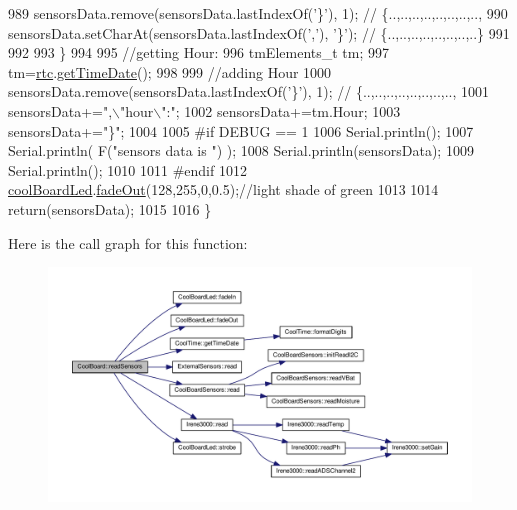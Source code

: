 \begin{DoxyCode}
989         sensorsData.remove(sensorsData.lastIndexOf(\textcolor{charliteral}{'\}'}), 1); \textcolor{comment}{// \{..,..,..,..,..,..,..,..,}
990         sensorsData.setCharAt(sensorsData.lastIndexOf(\textcolor{charliteral}{','}), \textcolor{charliteral}{'\}'}); \textcolor{comment}{// \{..,..,..,..,..,..,..,..\}      }
991         
992         
993     \}
994 
995     \textcolor{comment}{//getting Hour:}
996     tmElements\_t tm;
997     tm=\hyperlink{classCoolBoard_a50d2a6716879d64a85f3c6b44ad63275}{rtc}.\hyperlink{classCoolTime_a7a7501c5ca77dd1248bea704c44f986c}{getTimeDate}();
998     
999     \textcolor{comment}{//adding Hour}
1000     sensorsData.remove(sensorsData.lastIndexOf(\textcolor{charliteral}{'\}'}), 1); \textcolor{comment}{// \{..,..,..,..,..,..,..,..,   }
1001     sensorsData+=\textcolor{stringliteral}{",\(\backslash\)"hour\(\backslash\)":"};  
1002     sensorsData+=tm.Hour;
1003     sensorsData+=\textcolor{stringliteral}{"\}"};
1004     
1005 \textcolor{preprocessor}{#if DEBUG == 1}
1006     Serial.println();
1007     Serial.println( F(\textcolor{stringliteral}{"sensors data is "}) );
1008     Serial.println(sensorsData);
1009     Serial.println();
1010 
1011 \textcolor{preprocessor}{#endif}
1012     \hyperlink{classCoolBoard_a1b1d3c684a5baa56b08486e192fd8e97}{coolBoardLed}.\hyperlink{classCoolBoardLed_a93d545679237e8cc858324367149775c}{fadeOut}(128,255,0,0.5);\textcolor{comment}{//light shade of green}
1013 
1014     \textcolor{keywordflow}{return}(sensorsData);
1015 
1016 \}
\end{DoxyCode}
Here is the call graph for this function\+:
\nopagebreak
\begin{figure}[H]
\begin{center}
\leavevmode
\includegraphics[width=350pt]{classCoolBoard_ad03abdce2e65f520bbf2cff0f2d083cf_cgraph}
\end{center}
\end{figure}
